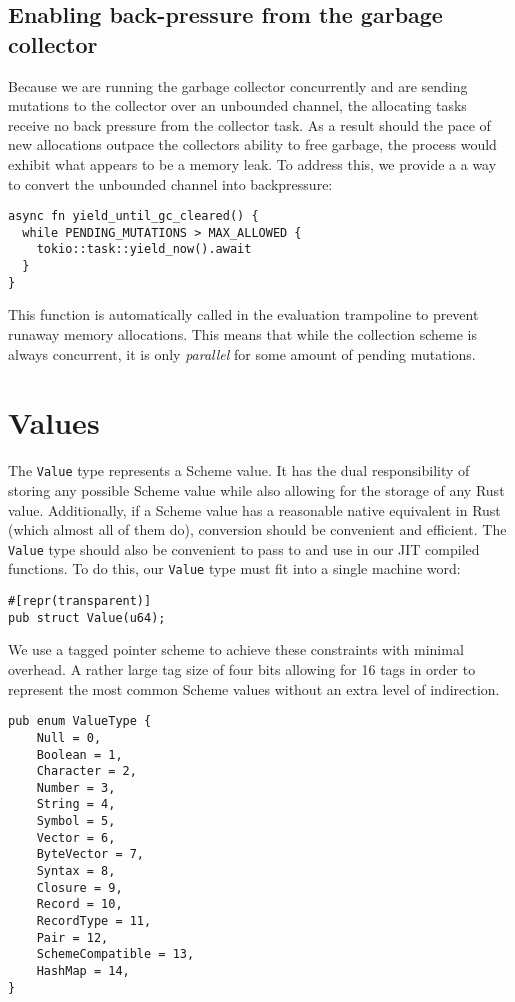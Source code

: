 \documentclass[sigplan,review,anonymous]{acmart}
\begin{document}
\subsection{Enabling back-pressure from the garbage collector}

Because we are running the garbage collector concurrently and are sending
mutations to the collector over an unbounded channel, the allocating tasks
receive no back pressure from the collector task. As a result should the pace
of new allocations outpace the collectors ability to free garbage, the process
would exhibit what appears to be a memory leak. To address this, we provide a
a way to convert the unbounded channel into backpressure:

\begin{verbatim}
async fn yield_until_gc_cleared() {
  while PENDING_MUTATIONS > MAX_ALLOWED {
    tokio::task::yield_now().await
  }
}
\end{verbatim}

This function is automatically called in the evaluation trampoline to prevent
runaway memory allocations. This means that while the collection scheme is
always concurrent, it is only \textit{parallel} for some amount of pending
mutations.

\section{Values}

The \texttt{Value} type represents a Scheme value. It has the dual responsibility
of storing any possible Scheme value while also allowing for the storage of any
Rust value. Additionally, if a Scheme value has a reasonable native equivalent
in Rust (which almost all of them do), conversion should be convenient and
efficient. The \texttt{Value} type should also be convenient to pass to and
use in our JIT compiled functions. To do this, our \texttt{Value} type must fit
into a single machine word:

\begin{verbatim}
#[repr(transparent)]
pub struct Value(u64);
\end{verbatim}

We use a tagged pointer\cite{tags} scheme to achieve these constraints with
minimal overhead. A rather large tag size of four bits allowing for 16 tags in
order to represent the most common Scheme values without an extra level of
indirection.

\begin{verbatim}
pub enum ValueType {
    Null = 0,
    Boolean = 1,
    Character = 2,
    Number = 3,
    String = 4,
    Symbol = 5,
    Vector = 6,
    ByteVector = 7,
    Syntax = 8,
    Closure = 9,
    Record = 10,
    RecordType = 11,
    Pair = 12,
    SchemeCompatible = 13,
    HashMap = 14,
}
\end{verbatim}
\end{document}
